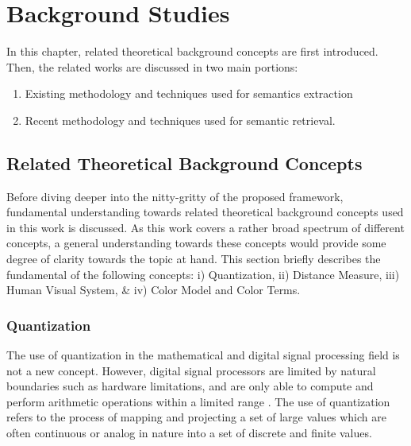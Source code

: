 


\chapter{Background Studies}
\label{section:litreview}

In this chapter, related theoretical background concepts are first introduced. Then, the related works are discussed in two main portions: 
\begin{enumerate}
    \item Existing methodology and techniques used for semantics extraction
    \item Recent methodology and techniques used for semantic retrieval.
\end{enumerate}



\section{Related Theoretical Background Concepts}
\label{subsec:relatedConcepts}

Before diving deeper into the nitty-gritty of the proposed framework, fundamental understanding towards related theoretical background concepts used in this work is discussed. As this work covers a rather broad spectrum of different concepts, a general understanding towards these concepts would provide some degree of clarity towards the topic at hand. This section briefly describes the fundamental of the following concepts: i) Quantization, ii) Distance Measure, iii) Human Visual System, \& iv) Color Model and Color Terms. 


\subsection{Quantization}

The use of quantization in the mathematical and digital signal processing field is not a new concept. However, digital signal processors are limited by natural boundaries such as hardware limitations, and are only able to compute and perform arithmetic operations within a limited range \cite{spors_2018}. The use of quantization refers to the process of mapping and projecting a set of large values which are often continuous or analog in nature into a set of discrete and finite values. 

